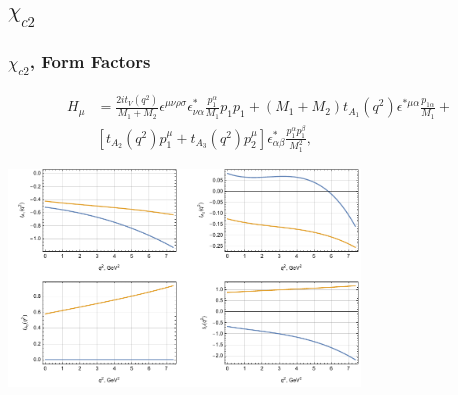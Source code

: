 \documentclass{beamer}
\begin{document}
\begin{frame}[t]
\begin{columns}
\begin{column}{0.5\textwidth}
    \end{column}
  \end{columns}
\end{frame}


\subsection{$\chi_{c2}$}
\begin{frame}
  \frametitle{$\chi_{c2}$, Form Factors}
  \begin{align*}
  H_\mu &=
\frac{2it_V(q^2)}{M_1+M_2} \epsilon^{\mu\nu\rho\sigma}\epsilon^*_{\nu\alpha}
          \frac{p_1^\alpha}{M_1}  p_1 p_1  
     +  (M_1+M_2)t_{A_1}(q^2)\epsilon^{*\mu\alpha}\frac{p_{1\alpha}}{M_1} +\\
&  [t_{A_2}(q^2)p_1^\mu+t_{A_3}(q^2)p_2^\mu]\epsilon^*_{\alpha\beta}
\frac{p_1^\alpha p_1^\beta}{M_1^2} , 
  \end{align*}

\begin{center}
  \includegraphics[width=0.7\textwidth]{figs/ff_chi_c2}
\end{center}
\end{frame}
\end{document}
